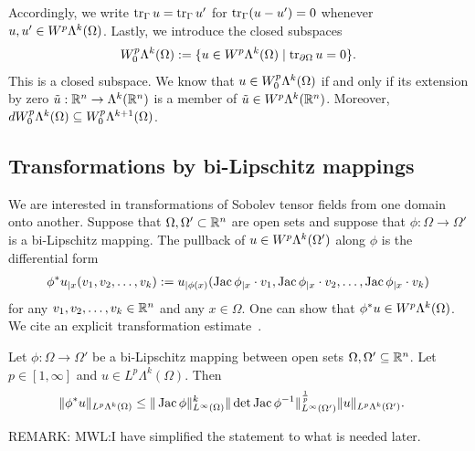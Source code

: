 \documentclass[10pt,letterpaper]{article}
\newcommand{\todo}[1]{{\colorbox{yellow}{#1}}}
\newcommand\cye[1]{%
\protect\leavevmode
\begingroup
    \color{red!35!yellow}%
    #1%
\endgroup
}
\newcommand{\mwl}[1]{{\color{red}#1}}
\newcommand{\notice}[1]{{\color{red}REMARK: #1}}
\begin{document}
Accordingly, we write $\operatorname{tr}_{\Gamma} u = \operatorname{tr}_{\Gamma} u'$ for $\operatorname{tr}_{\Gamma} (u-u') = 0$ whenever $u, u' \in W^{p}\Lambda^{k}(\Omega)$.
Lastly, we introduce the closed subspaces 
\begin{gather*}
    W^{p}_{0}\Alt^{k}(\Omega) 
    := 
    \{ u \in W^{p}\Alt^{k}(\Omega) \suchthat \trace_{\partial \Omega} u = 0 \}
    .
\end{gather*}
\mwl{This is a closed subspace. We know that $u \in W^{p}_{0}\Lambda^{k}(\Omega)$ if and only if its extension by zero $\tilde u : {\mathbb R}^{n} \rightarrow \Lambda^{k}({\mathbb R}^{n})$ is a member of $\tilde u \in W^{p}\Lambda^{k}({\mathbb R}^{n})$. Moreover, $d W^{p}_{0}\Lambda^{k}(\Omega) \subseteq W^{p}_{0}\Lambda^{k+1}(\Omega)$.}


\subsection{Transformations by bi-Lipschitz mappings}

We are interested in transformations of Sobolev tensor fields from one domain onto another. 
Suppose that $\Omega,\Omega' \subset {\mathbb R}^{n}$ are open sets and suppose that $\phi: \Omega \to \Omega'$ is a bi-Lipschitz mapping.
The pullback of $u \in W^{p}\Lambda^{k}(\Omega')$ along $\phi$ is the differential form 
\begin{align} \label{equation:pullback}
    \phi^{\ast}u_{|x}( v_{1}, v_{2}, \ldots, v_{k} ) 
    := 
    u_{|\phi(x)}( \operatorname{{\rm Jac}}\phi_{|x} \cdot v_1, \operatorname{{\rm Jac}}\phi_{|x} \cdot v_2, \ldots, \operatorname{{\rm Jac}}\phi_{|x} \cdot v_k ) 
\end{align}
for any $v_1, v_2, \dots, v_k \in {\mathbb R}^{n}$ and any $x \in \Omega$. One can show that $\phi^{\ast}u \in W^{p}\Lambda^{k}(\Omega)$.
We cite an explicit transformation estimate~\cite{licht2019smoothed}.

\begin{proposition} \label{proposition:pullbackestimate}
 Let $\phi : \Omega \rightarrow \Omega'$ be a bi-Lipschitz mapping between open sets $\Omega, \Omega' \subseteq {\mathbb R}^{n}$.
 Let $p \in [1,\infty]$ and $u \in L^{p}\Lambda^{k}(\Omega)$. 
 Then 
 \begin{align}\label{math:pullbackestimate}
  \begin{split}
  \| \phi^{\ast} u \|_{L^{p}\Lambda^{k}(\Omega)}
  &\leq 
  \| \operatorname{{\rm Jac}} \phi \|^{k}_{L^{\infty}(\Omega)}
  \| \det\operatorname{{\rm Jac}} \phi^{-1} \|^{\frac{1}{p}}_{L^{\infty}(\Omega')}
  \| u \|_{L^{p}\Lambda^{k}(\Omega')}
  .
  \end{split}
 \end{align}
\end{proposition}
\notice{MWL:I have simplified the statement to what is needed later.}
\end{document}
